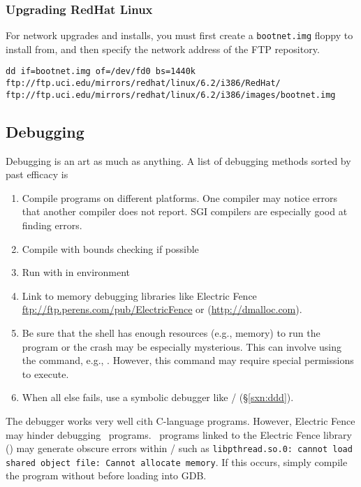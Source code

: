 \documentclass[12pt,twoside]{article}
\begin{document}
\subsubsection{Upgrading RedHat Linux}\label{sxn:rh3}
For network upgrades and installs, you must first create a
\verb'bootnet.img' floppy to install from, and then specify
the network address of the  FTP repository.
\begin{verbatim}
dd if=bootnet.img of=/dev/fd0 bs=1440k
ftp://ftp.uci.edu/mirrors/redhat/linux/6.2/i386/RedHat/
ftp://ftp.uci.edu/mirrors/redhat/linux/6.2/i386/images/bootnet.img
\end{verbatim}

\subsection[Debugging]{Debugging}\label{sxn:dbg}
Debugging is an art as much as anything.
A list of debugging methods sorted by past efficacy is
\begin{enumerate}
\item Compile programs on different platforms.
One compiler may notice errors that another compiler does not report.
SGI compilers are especially good at finding errors.
\item Compile with bounds checking if possible
\item Run with  in environment
\item Link to memory debugging libraries like Electric Fence 
\url{ftp://ftp.perens.com/pub/ElectricFence} or
 (\url{http://dmalloc.com}).
\item Be sure that the shell has enough resources (e.g., memory) to
run the program or the crash may be especially mysterious.
This can involve using the  command, e.g.,
.
However, this command may require special permissions to execute. 
\item When all else fails, use a symbolic debugger like
  / (\S\ref{sxn:ddd}).
\end{enumerate}
The  debugger works very well cith C-language
programs. 
However, Electric Fence may hinder debugging \cxx\ programs.
\cxx\ programs linked to the Electric Fence library
() may generate obscure errors within
/ such as 
\verb'libpthread.so.0: cannot load shared object file: Cannot allocate memory'. 
If this occurs, simply compile the program without 
before loading into GDB. 
\end{document}
